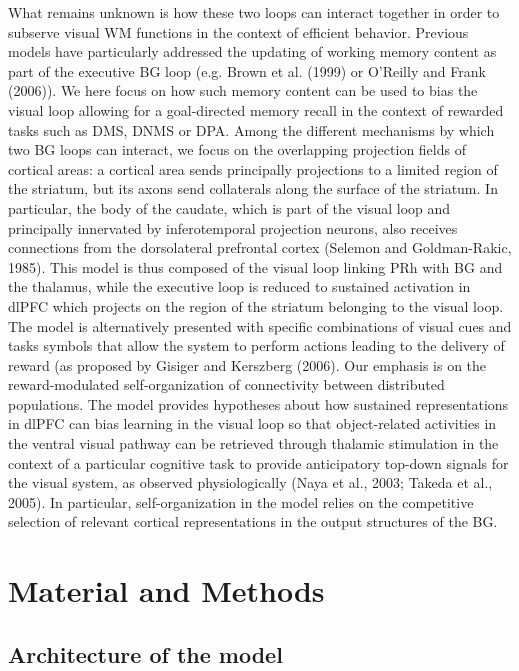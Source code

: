 \documentclass[
  11pt,
  a4paper,
]{scrbook}
\begin{document}
What remains unknown is how these two loops can interact together in
order to subserve visual WM functions in the context of efficient
behavior. Previous models have particularly addressed the updating of
working memory content as part of the executive BG loop (e.g. Brown et
al. (1999) or O'Reilly and Frank (2006)). We here focus on how such
memory content can be used to bias the visual loop allowing for a
goal-directed memory recall in the context of rewarded tasks such as
DMS, DNMS or DPA. Among the different mechanisms by which two BG loops
can interact, we focus on the overlapping projection fields of cortical
areas: a cortical area sends principally projections to a limited region
of the striatum, but its axons send collaterals along the surface of the
striatum. In particular, the body of the caudate, which is part of the
visual loop and principally innervated by inferotemporal projection
neurons, also receives connections from the dorsolateral prefrontal
cortex (Selemon and Goldman-Rakic, 1985). This model is thus composed of
the visual loop linking PRh with BG and the thalamus, while the
executive loop is reduced to sustained activation in dlPFC which
projects on the region of the striatum belonging to the visual loop. The
model is alternatively presented with specific combinations of visual
cues and tasks symbols that allow the system to perform actions leading
to the delivery of reward (as proposed by Gisiger and Kerszberg (2006).
Our emphasis is on the reward-modulated self-organization of
connectivity between distributed populations. The model provides
hypotheses about how sustained representations in dlPFC can bias
learning in the visual loop so that object-related activities in the
ventral visual pathway can be retrieved through thalamic stimulation in
the context of a particular cognitive task to provide anticipatory
top-down signals for the visual system, as observed physiologically
(Naya et al., 2003; Takeda et al., 2005). In particular,
self-organization in the model relies on the competitive selection of
relevant cortical representations in the output structures of the BG.

\section{Material and Methods}\label{material-and-methods}

\subsection{Architecture of the
model}\label{architecture-of-the-model-1}
\end{document}
